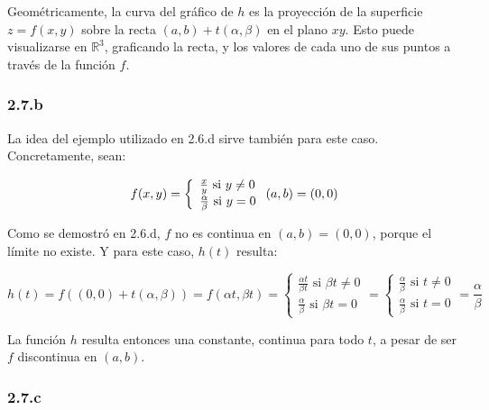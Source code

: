 \documentclass{article}
\renewcommand{\Bbb}{\mathbb}
\begin{document}
Geométricamente, la curva del gráfico de $h$ es la proyección de la superficie $z = f(x,y)$ sobre la recta $(a,b) + t(\alpha,\beta)$ en el plano $xy$. Esto puede visualizarse en $\Bbb R^3$, graficando la recta, y los valores de cada uno de sus puntos a través de la función $f$.

\subsubsection*{2.7.b}
\label{subsubsec:2.7.b}

La idea del ejemplo utilizado en 2.6.d sirve también para este caso. Concretamente, sean:

\begin{equation}
f(x,y) = \left\{ \begin{array}{ll}
\frac{x}{y} \text{ si } y \neq 0 \\
\frac{\alpha}{\beta} \text{ si } y = 0
\end{array} \right. \\
(a,b) = (0,0)
\end{equation}

Como se demostró en 2.6.d, $f$ no es continua en $(a,b) = (0,0)$, porque el límite no existe. Y para este caso, $h(t)$ resulta:

\begin{equation}
h(t) = f((0,0) + t(\alpha, \beta)) = f(\alpha t, \beta t) = \left\{ \begin{array}{ll}
\frac{\alpha t}{\beta t} \text{ si } \beta t \neq 0 \\
\frac{\alpha}{\beta} \text{ si } \beta t = 0
\end{array} \right. = \left\{ \begin{array}{ll}
\frac{\alpha}{\beta} \text{ si } t \neq 0 \\
\frac{\alpha}{\beta} \text{ si } t = 0
\end{array} \right. = \frac{\alpha}{\beta}
\end{equation}

La función $h$ resulta entonces una constante, continua para todo $t$, a pesar de ser $f$ discontinua en $(a,b)$.

\subsubsection*{2.7.c}
\label{subsubsec:2.7.c}
\end{document}
